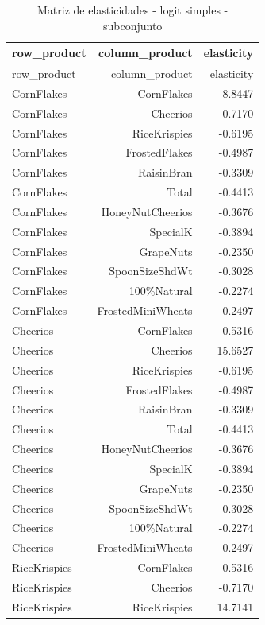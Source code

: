 \begingroup
\scriptsize
\begin{longtable}{@{}lrr@{}}
\caption{Matriz de elasticidades - logit simples - subconjunto}\label{tab:elas-simple-subset}\\
\toprule
row\_product & column\_product & elasticity \\
\midrule
\endfirsthead
\toprule
row\_product & column\_product & elasticity \\
\midrule
\endhead
CornFlakes & CornFlakes & 8.8447 \\
CornFlakes & Cheerios & -0.7170 \\
CornFlakes & RiceKrispies & -0.6195 \\
CornFlakes & FrostedFlakes & -0.4987 \\
CornFlakes & RaisinBran & -0.3309 \\
CornFlakes & Total & -0.4413 \\
CornFlakes & HoneyNutCheerios & -0.3676 \\
CornFlakes & SpecialK & -0.3894 \\
CornFlakes & GrapeNuts & -0.2350 \\
CornFlakes & SpoonSizeShdWt & -0.3028 \\
CornFlakes & 100\%Natural & -0.2274 \\
CornFlakes & FrostedMiniWheats & -0.2497 \\
Cheerios & CornFlakes & -0.5316 \\
Cheerios & Cheerios & 15.6527 \\
Cheerios & RiceKrispies & -0.6195 \\
Cheerios & FrostedFlakes & -0.4987 \\
Cheerios & RaisinBran & -0.3309 \\
Cheerios & Total & -0.4413 \\
Cheerios & HoneyNutCheerios & -0.3676 \\
Cheerios & SpecialK & -0.3894 \\
Cheerios & GrapeNuts & -0.2350 \\
Cheerios & SpoonSizeShdWt & -0.3028 \\
Cheerios & 100\%Natural & -0.2274 \\
Cheerios & FrostedMiniWheats & -0.2497 \\
RiceKrispies & CornFlakes & -0.5316 \\
RiceKrispies & Cheerios & -0.7170 \\
RiceKrispies & RiceKrispies & 14.7141 \\

\end{longtable}
